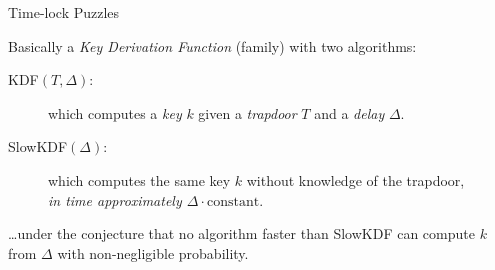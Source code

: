\documentclass[aspectratio=169]{beamer}
\begin{document}
\begin{frame}{Time-lock Puzzles}
  \begin{center}
  \end{center}

  Basically a \emph{Key Derivation Function} (family) with two
  algorithms: \medskip
  \begin{description}
  \item[KDF$(T, \Delta)$:] which computes a \emph{key} $k$
    given a \emph{trapdoor} $T$ and a \emph{delay} $\Delta$.
  \item[SlowKDF$(\Delta)$:] which computes the same key $k$
    without knowledge of the trapdoor,\\
    \emph{in time approximately $\Delta\cdot\mathrm{constant}$}.
  \end{description}
  \smallskip \dots under the conjecture that no algorithm faster than
  SlowKDF can compute $k$ from $\Delta$ with non-negligible
  probability.
\end{frame}

\end{document}
